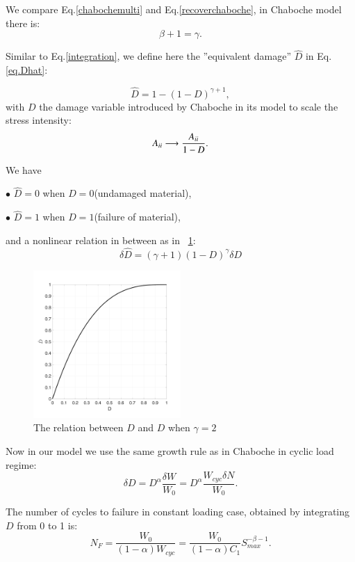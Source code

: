 \documentclass[3p,times,number,review]{elsarticle}
\newcommand{\figref}[1]{\figurename~\ref{#1}}
\begin{document}
We compare Eq.\eqref{chabochemulti} and Eq.\eqref{recoverchaboche}, in Chaboche model there is:
$$\beta+1=\gamma. $$

Similar to Eq.\eqref{integration}, we define here the ''equivalent damage'' $\hat{D}$ in Eq.\eqref{eq.Dhat}:

\begin{equation}
\hat{D}=1-(1-D)^{\gamma+1},
\label{eq.Dhat}
\end{equation}
with $D$ the damage variable introduced by Chaboche in its model to scale the stress intensity:
$${A}_{\uppercase\expandafter{\romannumeral2}} \longrightarrow \dfrac{{A}_{\uppercase\expandafter{\romannumeral2}}}{1-D}.$$

We have 

$\bullet$ $\hat{D}=0$ when $D=0$(undamaged material),

$\bullet$ $\hat{D}=1$ when $D=1$(failure of material),	

and a nonlinear relation in between as in \figref{fig.Dhat}:
$$\delta\hat{D}=\left(\gamma+1 \right)\left( 1-D\right)^\gamma \delta D$$	
\begin{figure}
	\centering
	\includegraphics[width=0.5\textwidth]{figures//Dhat.png} 
	\caption{The relation between $\hat{D}$ and $D$ when $\gamma=2$}
	\label{fig.Dhat}
\end{figure}

Now in our model we use the same growth rule as in Chaboche in cyclic load regime:
\begin{equation}
\delta D=D^\alpha\dfrac{\delta W}{W_0}=D^\alpha\dfrac{W_{cyc}\delta N}{W_0}.
\label{eq.DWcyc}
\end{equation}

The number of cycles to failure in constant loading case, obtained by integrating $D$ from 0 to 1 is:
\begin{equation}
N_F=\dfrac{W_0}{\left( 1-\alpha\right)W_{cyc} }=\dfrac{W_0}{\left( 1-\alpha\right)C_1}S_{max}^{-\beta-1}.
\label{eq.NFWcyc}
\end{equation}
 
\end{document}
